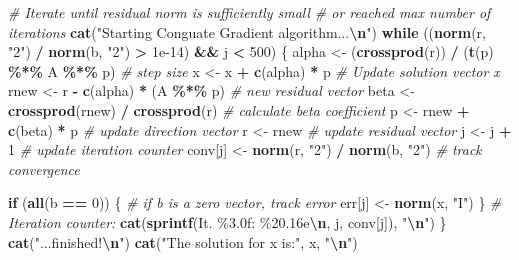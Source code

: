 \documentclass[
]{article}
\newenvironment{Shaded}{\begin{snugshade}}{\end{snugshade}}
\newcommand{\CommentTok}[1]{\textcolor[rgb]{0.56,0.35,0.01}{\textit{#1}}}
\newcommand{\ControlFlowTok}[1]{\textcolor[rgb]{0.13,0.29,0.53}{\textbf{#1}}}
\newcommand{\DecValTok}[1]{\textcolor[rgb]{0.00,0.00,0.81}{#1}}
\newcommand{\FloatTok}[1]{\textcolor[rgb]{0.00,0.00,0.81}{#1}}
\newcommand{\FunctionTok}[1]{\textcolor[rgb]{0.13,0.29,0.53}{\textbf{#1}}}
\newcommand{\NormalTok}[1]{#1}
\newcommand{\OtherTok}[1]{\textcolor[rgb]{0.56,0.35,0.01}{#1}}
\newcommand{\SpecialCharTok}[1]{\textcolor[rgb]{0.81,0.36,0.00}{\textbf{#1}}}
\newcommand{\StringTok}[1]{\textcolor[rgb]{0.31,0.60,0.02}{#1}}
\begin{document}
\begin{Shaded}
\begin{Highlighting}[]
  \CommentTok{\# Iterate until residual norm is sufficiently small}
  \CommentTok{\# or reached max number of iterations}
  \FunctionTok{cat}\NormalTok{(}\StringTok{"Starting Conguate Gradient algorithm...}\SpecialCharTok{\textbackslash{}n}\StringTok{"}\NormalTok{)}
  \ControlFlowTok{while}\NormalTok{ ((}\FunctionTok{norm}\NormalTok{(r, }\StringTok{"2"}\NormalTok{) }\SpecialCharTok{/} \FunctionTok{norm}\NormalTok{(b, }\StringTok{"2"}\NormalTok{) }\SpecialCharTok{\textgreater{}} \FloatTok{1e{-}14}\NormalTok{) }\SpecialCharTok{\&\&}\NormalTok{ j }\SpecialCharTok{\textless{}} \DecValTok{500}\NormalTok{) \{}
\NormalTok{    alpha }\OtherTok{\textless{}{-}}\NormalTok{ (}\FunctionTok{crossprod}\NormalTok{(r)) }\SpecialCharTok{/}\NormalTok{ (}\FunctionTok{t}\NormalTok{(p) }\SpecialCharTok{\%*\%}\NormalTok{ A }\SpecialCharTok{\%*\%}\NormalTok{ p)  }\CommentTok{\# step size}
\NormalTok{    x }\OtherTok{\textless{}{-}}\NormalTok{ x }\SpecialCharTok{+} \FunctionTok{c}\NormalTok{(alpha) }\SpecialCharTok{*}\NormalTok{ p  }\CommentTok{\# Update solution vector x}
\NormalTok{    rnew }\OtherTok{\textless{}{-}}\NormalTok{ r }\SpecialCharTok{{-}} \FunctionTok{c}\NormalTok{(alpha) }\SpecialCharTok{*}\NormalTok{ (A }\SpecialCharTok{\%*\%}\NormalTok{ p)  }\CommentTok{\# new residual vector}
\NormalTok{    beta }\OtherTok{\textless{}{-}}
      \FunctionTok{crossprod}\NormalTok{(rnew) }\SpecialCharTok{/} \FunctionTok{crossprod}\NormalTok{(r)  }\CommentTok{\# calculate beta coefficient}
\NormalTok{    p }\OtherTok{\textless{}{-}}\NormalTok{ rnew }\SpecialCharTok{+} \FunctionTok{c}\NormalTok{(beta) }\SpecialCharTok{*}\NormalTok{ p  }\CommentTok{\# update direction vector}
\NormalTok{    r }\OtherTok{\textless{}{-}}\NormalTok{ rnew  }\CommentTok{\# update residual vector}
\NormalTok{    j }\OtherTok{\textless{}{-}}\NormalTok{ j }\SpecialCharTok{+} \DecValTok{1}  \CommentTok{\# update iteration counter}
\NormalTok{    conv[j] }\OtherTok{\textless{}{-}} \FunctionTok{norm}\NormalTok{(r, }\StringTok{"2"}\NormalTok{) }\SpecialCharTok{/} \FunctionTok{norm}\NormalTok{(b, }\StringTok{"2"}\NormalTok{)  }\CommentTok{\# track convergence}
    
    \ControlFlowTok{if}\NormalTok{ (}\FunctionTok{all}\NormalTok{(b }\SpecialCharTok{==} \DecValTok{0}\NormalTok{)) \{}
      \CommentTok{\# if b is a zero vector, track error}
\NormalTok{      err[j] }\OtherTok{\textless{}{-}} \FunctionTok{norm}\NormalTok{(x, }\StringTok{"I"}\NormalTok{)}
\NormalTok{    \}}
    \CommentTok{\# Iteration counter:}
    \FunctionTok{cat}\NormalTok{(}\FunctionTok{sprintf}\NormalTok{(}\StringTok{\textquotesingle{}It. \%3.0f: \%20.16e}\SpecialCharTok{\textbackslash{}n}\StringTok{\textquotesingle{}}\NormalTok{, j, conv[j]), }\StringTok{"}\SpecialCharTok{\textbackslash{}n}\StringTok{"}\NormalTok{)}
\NormalTok{  \}}
  \FunctionTok{cat}\NormalTok{(}\StringTok{"...finished!}\SpecialCharTok{\textbackslash{}n}\StringTok{"}\NormalTok{)}
  \FunctionTok{cat}\NormalTok{(}\StringTok{"The solution for x is:"}\NormalTok{, x, }\StringTok{"}\SpecialCharTok{\textbackslash{}n}\StringTok{"}\NormalTok{)}
  

\end{Highlighting}
\end{Shaded}
\end{document}
